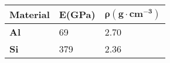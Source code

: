 \begin{tabular}{| m{7em} | m{7em} | m{7em} |}
    \hline
    \textbf{Material} & \textbf{E(GPa)} & $\mathbf{\rho (g\cdot cm^{-3})}$\\
    \hline
    \textbf{Al} & 69 & 2.70\\
    \hline
    \textbf{Si} & 379 & 2.36\\
    \hline
    
\end{tabular}